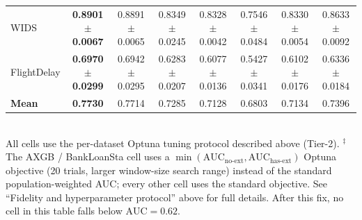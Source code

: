 \documentclass[sigconf]{acmart}
\begin{document}
\begin{itemize}
\begin{table}[h]
{\begin{tabular}{l c c c c c c c}
WIDS           & \textbf{0.8901 $\pm$ 0.0067} & 0.8891 $\pm$ 0.0065 & 0.8349 $\pm$ 0.0245 & 0.8328 $\pm$ 0.0042 & 0.7546 $\pm$ 0.0484 & 0.8330 $\pm$ 0.0054 & 0.8633 $\pm$ 0.0092 \\
FlightDelay    & \textbf{0.6970 $\pm$ 0.0299} & 0.6942 $\pm$ 0.0295 & 0.6283 $\pm$ 0.0207 & 0.6077 $\pm$ 0.0136 & 0.5427 $\pm$ 0.0341 & 0.6102 $\pm$ 0.0176 & 0.6336 $\pm$ 0.0184 \\
\midrule
\textbf{Mean}  & \textbf{0.7730} & 0.7714 & 0.7285 & 0.7128 & 0.6803 & 0.7134 & 0.7396 \\
\bottomrule
\end{tabular}%
}
\\[2pt]
{\footnotesize All cells use the per-dataset Optuna tuning protocol described above (Tier-2). $^{\ddagger}$ The AXGB / BankLoanSta cell uses a $\min(\text{AUC}_\text{no-ext}, \text{AUC}_\text{has-ext})$ Optuna objective (20 trials, larger window-size search range) instead of the standard population-weighted AUC; every other cell uses the standard objective. See ``Fidelity and hyperparameter protocol'' above for full details. After this fix, no cell in this table falls below $\text{AUC}=0.62$.}
\end{table}


\end{itemize}
\end{document}
